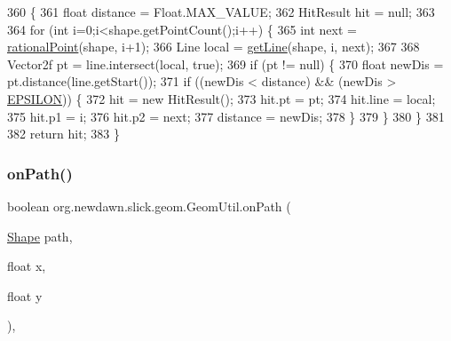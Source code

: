 \begin{DoxyCode}
360                                                        \{
361         \textcolor{keywordtype}{float} distance = Float.MAX\_VALUE;
362         HitResult hit = null;
363         
364         \textcolor{keywordflow}{for} (\textcolor{keywordtype}{int} i=0;i<shape.getPointCount();i++) \{
365             \textcolor{keywordtype}{int} next = \mbox{\hyperlink{classorg_1_1newdawn_1_1slick_1_1geom_1_1_geom_util_a6873a13095272143ffefcd31950b12fe}{rationalPoint}}(shape, i+1);
366             Line local = \mbox{\hyperlink{classorg_1_1newdawn_1_1slick_1_1geom_1_1_geom_util_a2db7a3e6a367a8dae2a86da8366afcd9}{getLine}}(shape, i, next);
367         
368             Vector2f pt = line.intersect(local, \textcolor{keyword}{true});
369             \textcolor{keywordflow}{if} (pt != null) \{
370                 \textcolor{keywordtype}{float} newDis = pt.distance(line.getStart());
371                 \textcolor{keywordflow}{if} ((newDis < distance) && (newDis > \mbox{\hyperlink{classorg_1_1newdawn_1_1slick_1_1geom_1_1_geom_util_a1dc7c8cb05b3d5bc684aced8dfe63a80}{EPSILON}})) \{
372                     hit = \textcolor{keyword}{new} HitResult();
373                     hit.pt = pt;
374                     hit.line = local;
375                     hit.p1 = i;
376                     hit.p2 = next;
377                     distance = newDis;
378                 \}
379             \}
380         \}
381         
382         \textcolor{keywordflow}{return} hit;
383     \}
\end{DoxyCode}
\mbox{\label{classorg_1_1newdawn_1_1slick_1_1geom_1_1_geom_util_aa1a89ad4cb34e2520cfbd7f1514637ff}} 
\subsubsection{\texorpdfstring{on\+Path()}{onPath()}}
{\footnotesize\ttfamily boolean org.\+newdawn.\+slick.\+geom.\+Geom\+Util.\+on\+Path (\begin{DoxyParamCaption}\item[{\mbox{\hyperlink{classorg_1_1newdawn_1_1slick_1_1geom_1_1_shape}{Shape}}}]{path,  }\item[{float}]{x,  }\item[{float}]{y }\end{DoxyParamCaption})\hspace{0.3cm}{\ttfamily [inline]}, {\ttfamily [private]}}

